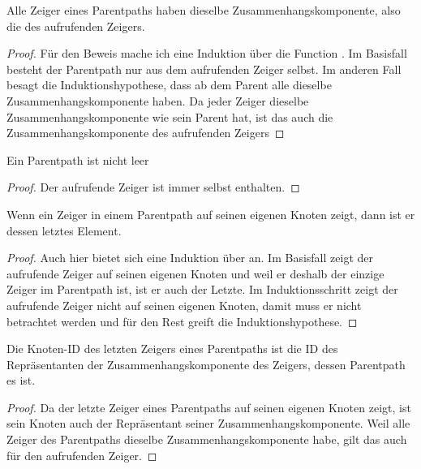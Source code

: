 \begin{lemma}[\KruskalconnectedcomponentofunionFindofunionFindLinkofgetparentpath]
  Alle Zeiger eines Parentpaths haben dieselbe Zusammenhangskomponente, also die des aufrufenden Zeigers.
\end{lemma}
\begin{proof}
  Für den Beweis mache ich eine Induktion über die Function \Kruskalgetparentpath.
  Im Basisfall besteht der Parentpath nur aus dem aufrufenden Zeiger selbst.
  Im anderen Fall besagt die Induktionshypothese, dass ab dem Parent alle dieselbe Zusammenhangskomponente haben.
  Da jeder Zeiger dieselbe Zusammenhangskomponente wie sein Parent hat, ist das auch die Zusammenhangskomponente des aufrufenden Zeigers
\end{proof}



\begin{lemma}[\Kruskalgetparentpathnonempty]
  Ein Parentpath ist nicht leer
\end{lemma}
\begin{proof}
  Der aufrufende Zeiger ist immer selbst enthalten.
\end{proof}



\begin{lemma}[\Kruskalgetparentpathendeqlast]
  Wenn ein Zeiger in einem Parentpath auf seinen eigenen Knoten zeigt, dann ist er dessen letztes Element.
\end{lemma}
\begin{proof}
  Auch hier bietet sich eine Induktion über \Kruskalgetparentpath an.
  Im Basisfall zeigt der aufrufende Zeiger auf seinen eigenen Knoten und weil er deshalb der einzige Zeiger im Parentpath ist, ist er auch der Letzte.
  Im Induktionsschritt zeigt der aufrufende Zeiger nicht auf seinen eigenen Knoten, damit muss er nicht betrachtet werden und für den Rest greift die Induktionshypothese.
\end{proof}



\begin{lemma}[\KruskalgetparentpathlasteqconnectedcomponentofunionFindofunionFindLink]\label{KruskalgetparentpathlasteqconnectedcomponentofunionFindofunionFindLink}
  Die Knoten-ID des letzten Zeigers eines Parentpaths ist die ID des Repräsentanten der Zusammenhangskomponente des Zeigers, dessen Parentpath es ist.
\end{lemma}
\begin{proof}
  Da der letzte Zeiger eines Parentpaths auf seinen eigenen Knoten zeigt, ist sein Knoten auch der Repräsentant seiner Zusammenhangskomponente.
  Weil alle Zeiger des Parentpaths dieselbe Zusammenhangskomponente habe, gilt das auch für den aufrufenden Zeiger.
\end{proof}

